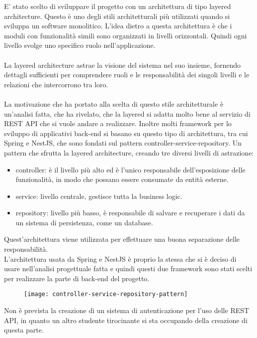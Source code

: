 E' stato scelto di sviluppare il progetto con un architettura di tipo layered architecture. Questo è uno
degli stili architetturali più utilizzati quando si sviluppa un software monolitico. L'idea dietro a 
questa architettura è che i moduli con funzionalità simili sono organizzati in livelli
orizzontali. Quindi ogni livello svolge uno specifico ruolo nell'applicazione.
\\\\
La layered architecture astrae la visione del sistema nel suo insieme, fornendo dettagli 
sufficienti per comprendere ruoli e le responsabilità dei singoli livelli e le relazioni
che intercorrono tra loro.
\\\\
La motivazione che ha portato alla scelta di questo stile architetturale è un'analisi fatta,
che ha rivelato, che la layered si adatta molto bene al servizio di REST API che
si vuole andare a realizzare. Inoltre molti framework per lo sviluppo di applicativi back-end si basano su questo tipo di architettura, tra cui
Spring e NestJS, che sono fondati sul pattern controller-service-repository. Un pattern
che sfrutta la layered architecture, creando tre diversi livelli di astrazione: 
\begin{itemize}
    \item controller: è il livello più alto ed è l'unico responsabile dell'esposizione delle
        funzionalità, in modo che possano essere consumate da entità esterne.
    \item service: livello centrale, gestisce tutta la business logic.
    \item repository: livello più basso, è responsabile di salvare e recuperare i dati da un
        sistema di persistenza, come un database.
\end{itemize}
\leavevmode\newline
Quest'architettura viene utilizzata per effettuare una buona separazione delle responsabilità.
\\
L'architettura usata da Spring e NestJS è proprio la stessa che si è deciso di usare nell'analisi progettuale fatta 
 e quindi questi due framework sono stati scelti per realizzare
la parte di back-end del progetto.
\leavevmode\newline
\begin{figure}[!h]
    \centering
    \texttt{[image: controller-service-repository-pattern]}
\end{figure}

Non è prevista la creazione di un sistema di autenticazione per l'uso delle REST API, in quanto 
un altro studente tirocinante si sta occupando della creazione di questa parte.

